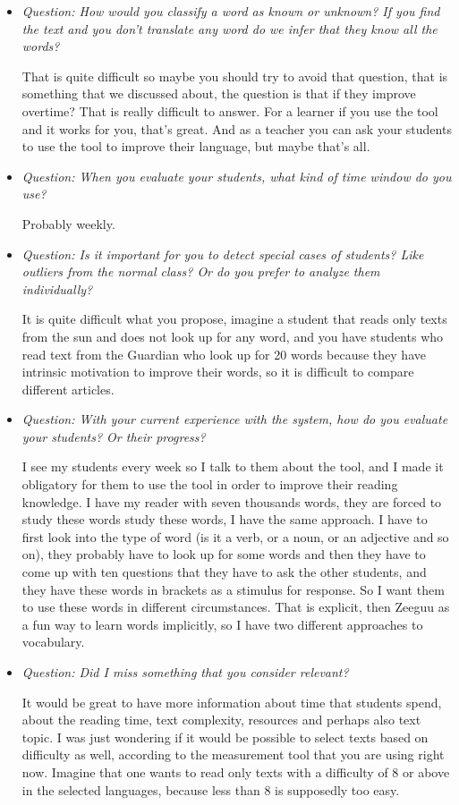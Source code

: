 \begin{itemize}
	\item \textit{Question: How would you classify a word as known or unknown? If you find the text and you don't translate any word do we infer that they know all the words?}
	
That is quite difficult so maybe you should try to avoid that question, that is something that we discussed about, the question is that if they improve overtime? That is really difficult to answer. For a learner if you use the tool and it works for you, that's great. And as a teacher you can ask your students to use the tool to improve their language, but maybe that's all.

	\item \textit{Question: When you evaluate your students, what kind of time window do you use?}
	
Probably weekly.

	\item \textit{Question: Is it important for you to detect special cases of students? Like outliers from the normal class? Or do you prefer to analyze them individually?}
	
It is quite difficult what you propose, imagine a student that reads only texts from the sun and does not look up for any word, and you have students who read text from the Guardian who look up for 20 words because they have intrinsic motivation to improve their words, so it is difficult to compare different articles.

	\item \textit{Question: With your current experience with the system, how do you evaluate your students? Or their progress?}
	
I see my students every week so I talk to them about the tool, and I made it obligatory for them to use the tool in order to improve their reading knowledge. I have my reader with seven thousands words, they are forced to study these words study these words, I have the same approach. I have to first look into the type of word (is it a verb, or a noun, or an adjective and so on), they probably have to look up for some words and then they have to come up with ten questions that they have to ask the other students, and they have these words in brackets as a stimulus for response. So I want them to use these words in different circumstances. That is explicit, then Zeeguu as a fun way to learn words implicitly, so I have two different approaches to vocabulary.

	\item \textit{Question: Did I miss something that you consider relevant?}
	
It would be great to have more information about time that students spend, about the reading time, text complexity, resources and perhaps also text topic.
I was just wondering if it would be possible to select texts based on difficulty as well, according to the measurement tool that you are using right now. Imagine that one wants to read only texts with a difficulty of 8 or above in the selected languages, because less than 8 is supposedly too easy.
\end{itemize}